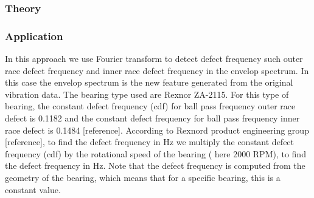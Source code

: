 \documentclass[11pt, oneside]{article}   	%
\begin{document}
\subsubsection{Theory}
\subsubsection{Application}
In this approach we use Fourier transform to detect defect frequency such outer race defect frequency and inner race defect frequency in the envelop spectrum. In this case the envelop spectrum is the new feature generated from the original vibration data. The bearing type used are Rexnor ZA-2115. For this type of bearing, the constant defect frequency (cdf) for ball pass frequency outer race defect is 0.1182 and the constant defect frequency for ball pass frequency inner race defect is 0.1484 [reference]. According to Rexnord product engineering group [reference], to find the defect frequency in Hz we multiply the constant defect frequency (cdf) by the rotational speed of the bearing ( here 2000 RPM), to find the defect frequency in Hz. Note that the defect frequency is computed from the geometry of the bearing, which means that for a specific bearing, this is a constant value. 
\end{document}
